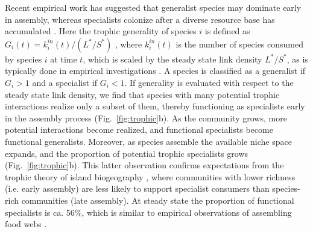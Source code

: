 \documentclass[twocolumn,preprintnumbers,amsmath,amssymb,superscriptaddress,linenumbers]{revtex4-1}
\newcommand{\rr}[1]{{\rm #1}}
\begin{document}
\begin{bibunit}
% 




Recent empirical work has suggested that generalist species may dominate early in assembly, whereas specialists colonize after a diverse resource base has accumulated \cite{Piechnik2008,Gravel2011}.
Here the trophic generality of species $i$ is defined as $G_i(t) = k_i^{in}(t)/(L^*/S^*)$ \cite{Williams2000}, where $k_i^{in}(t)$ is the number of species consumed by species $i$ at time $t$, which is scaled by the steady state link density $L^*/S^*$, as is typically done in empirical investigations \cite{Piechnik2008}.
A species is classified as a generalist if $G_i > 1$ and a specialist if $G_i < 1$.
If generality is evaluated with respect to the steady state link density, we find that species with many potential trophic interactions realize only a subset of them, thereby functioning as specialists early in the assembly process (Fig.\ \ref{fig:trophic}b).
As the community grows, more potential interactions become realized, and functional specialists become functional generalists.
Moreover, as species assemble the available niche space expands, and the proportion of potential trophic specialists grows (Fig.\ \ref{fig:trophic}b).
This latter observation confirms expectations from the trophic theory of island biogeography \cite{Gravel2011}, where communities with lower richness (i.e. early assembly) are less likely to support specialist consumers than species-rich communities (late assembly).
At steady state the proportion of functional specialists is ca. 56\%, which is similar to empirical observations of assembling food webs \cite{Piechnik2008}.



\end{bibunit}
\end{document}
